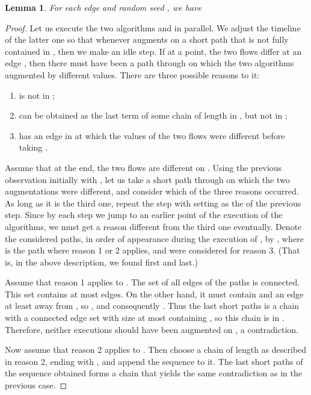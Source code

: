 \documentclass[12pt,a4paper]{article}
\newtheorem{Lemma}[Theorem]{Lemma}
\renewcommand{\:}{\colon}
\begin{document}
\begin{Lemma} \label{f2local}
For each edge  and random seed , we have

\end{Lemma}

\begin{proof}
Let us execute the two algorithms  and  in parallel. 
We adjust the timeline of the latter one so that whenever  augments on a short path  that is not fully contained in , then we make an idle step. 
If at a point, the two flows differ at an edge , then there must have been a path  through  on which the two algorithms augmented by different values. 
There are three possible reasons to it:
\begin{enumerate}
\item  is not in ;
\item  can be obtained as the last term of some chain of length  in , but not in ;
\item  has an edge  in  at which the values of the two flows were different before taking .
\end{enumerate}

Assume that at the end, the two flows are different on . 
Using the previous observation initially with , let us take a short path through  on which the two augmentations were different, and consider which of the three reasons occurred. 
As long as it is the third one, repeat the step with setting  as the  of the previous step. 
Since by each step we jump to an earlier point of the execution of the algorithms, we must get a reason different from the third one eventually. 
Denote the considered paths, in order of appearance during the execution of , by , where  is the path where reason 1 or 2 applies, and  were considered for reason 3. 
(That is, in the above description, we found  first and  last.)


Assume that reason 1 applies to .
The set of all edges of the  paths  is connected. 
This set contains at most  edges. 
On the other hand, it must contain  and an edge at least  away from , so , and consequently . Thus the last  short paths  is a chain with a connected edge set with size at most  containing , so this chain is in . 
Therefore, neither executions should have been augmented on , a contradiction. 

Now assume that reason 2 applies to . 
Then choose a chain of length  as described in reason 2, ending with , and append the sequence  to it. 
The last  short paths of the sequence obtained forms a chain that yields the same contradiction as in the previous case.
\end{proof}
\end{document}
